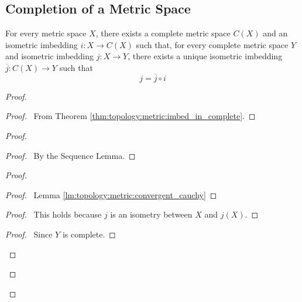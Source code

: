 \subsection{Completion of a Metric Space}

\begin{thm}
  For every metric space $X$, there exists a complete metric space $C(X)$ and an isometric imbedding $i : X \rightarrow C(X)$ such that, for every complete metric space $Y$ and isometric imbedding $j : X \rightarrow Y$, there exists a unique isometric imbedding $\overline{j} : C(X) \rightarrow Y$ such that
  \[ j = \overline{j} \circ i \]
\end{thm}

\begin{proof}
  \pf
  \begin{proof}
    \pf\ From Theorem \ref{thm:topology:metric:imbed_in_complete}.
  \end{proof}
  \begin{proof}
    \begin{proof}
      \pf\ By the Sequence Lemma.
    \end{proof}
    \begin{proof}
      \begin{proof}
        \pf\ Lemma \ref{lm:topology:metric:convergent_cauchy}
      \end{proof}
      \begin{proof}
        \pf\ This holds because $j$ is an isometry between $X$ and $j(X)$.
      \end{proof}
      \qedstep
      \begin{proof}
        \pf\ Since $Y$ is complete.
      \end{proof}

\end{proof}
\end{proof}
\end{proof}
